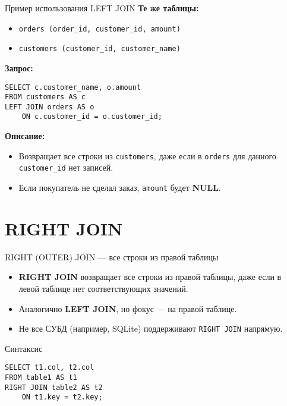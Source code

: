 \documentclass{beamer}
\begin{document}
\begin{frame}[fragile]{Пример использования LEFT JOIN}
	\textbf{Те же таблицы:}
	\begin{itemize}
		\item \texttt{orders (order\_id, customer\_id, amount)}
		\item \texttt{customers (customer\_id, customer\_name)}
	\end{itemize}

	\textbf{Запрос:}
	\begin{verbatim}
SELECT c.customer_name, o.amount
FROM customers AS c
LEFT JOIN orders AS o
    ON c.customer_id = o.customer_id;
\end{verbatim}

	\textbf{Описание:}
	\begin{itemize}
		\item Возвращает все строки из \texttt{customers}, даже если в \texttt{orders} для данного
		      \texttt{customer\_id} нет записей.
		\item Если покупатель не сделал заказ, \texttt{amount} будет \textbf{NULL}.
	\end{itemize}
\end{frame}

\section{RIGHT JOIN}
\begin{frame}[fragile]{RIGHT (OUTER) JOIN — все строки из правой таблицы}
	\begin{itemize}
		\item \textbf{RIGHT JOIN} возвращает все строки из правой таблицы,
		      даже если в левой таблице нет соответствующих значений.
		\item Аналогично \textbf{LEFT JOIN}, но фокус — на правой таблице.
		\item Не все СУБД (например, SQLite) поддерживают \texttt{RIGHT JOIN} напрямую.
	\end{itemize}
	\begin{block}{Синтаксис}
		\begin{verbatim}
SELECT t1.col, t2.col
FROM table1 AS t1
RIGHT JOIN table2 AS t2
    ON t1.key = t2.key;
\end{verbatim}
	\end{block}
\end{frame}
\end{document}
